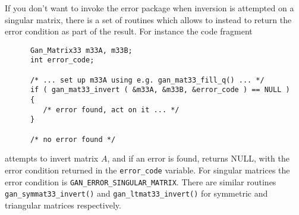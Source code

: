 If you don't want to invoke the error package when inversion is attempted
on a singular matrix, there is a set of routines which allows to instead to
return the error condition as part of the result. For instance the code
fragment
\begin{verbatim}
      Gan_Matrix33 m33A, m33B;
      int error_code;

      /* ... set up m33A using e.g. gan_mat33_fill_q() ... */
      if ( gan_mat33_invert ( &m33A, &m33B, &error_code ) == NULL )
      {
         /* error found, act on it ... */
      }

      /* no error found */
\end{verbatim}
attempts to invert matrix $A$, and if an error is found, returns NULL,
with the error condition returned in the {\tt error\_code} variable.
For singular matrices the error condition is
{\tt GAN\_ERROR\_SINGULAR\_MATRIX}. There are similar routines
{\tt gan\_symmat33\_invert()} and {\tt gan\_ltmat33\_invert()} for
symmetric and triangular matrices respectively.

